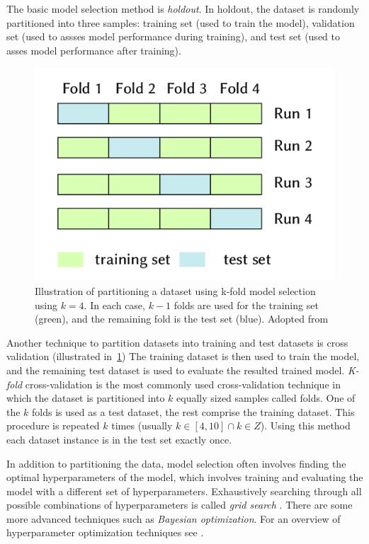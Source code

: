 The basic model selection method is \textit{holdout}. 
In holdout, the dataset is randomly partitioned into three 
samples: training set (used to train the model), 
validation set (used to assses model performance during training),
and test set (used to asses model performance after training). 

\begin{figure}
	\includegraphics[scale=0.7]{kfold.png}
	\caption{
		Illustration of partitioning a dataset using k-fold model 
	selection using $k = 4$. In each case, $k - 1$ folds
	are used for the training set (green), and the remaining fold is
	the test set (blue). Adopted from \citep{pedregosa2015feature}}
	\label{fig:kfold}
\end{figure}

Another technique to partition datasets into training and test datasets
is cross validation \citep{arlot2010survey} (illustrated in~\ref{fig:kfold})
The training dataset is then used to train the model, and the remaining
test dataset is used to evaluate the resulted trained model. 
\textit{K-fold} cross-validation is the most commonly used
cross-validation technique in which the dataset is partitioned into 
$k$ equally sized samples called folds. One of the $k$ folds is
used as a test dataset, the rest comprise the training dataset. This
procedure is repeated $k$ times (usually $k \in [4, 10] \cap k \in Z$).
Using this method each dataset instance is in the test set 
exactly once. 

In addition to partitioning the data, model selection often involves finding
the optimal hyperparameters of the model, which involves  training and
evaluating the model with a different set of hyperparameters.  Exhaustively
searching through all possible combinations of hyperparameters is called
\textit{grid search} \citep{bergstra2012random}. There are some more advanced
techniques such as \textit{Bayesian optimization}.  For an overview of
hyperparameter optimization techniques see \citep{snoek2012practical}.

